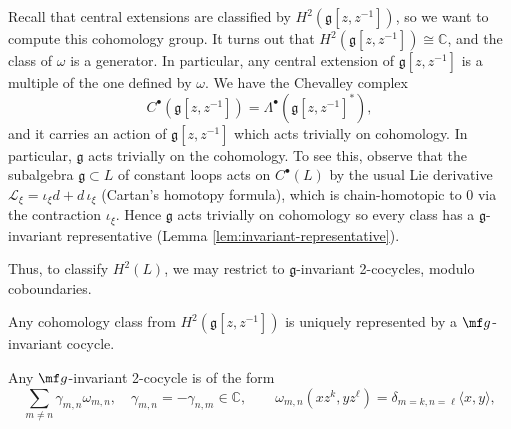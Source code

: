 \documentclass[12pt]{article}
\begin{document}
Recall that central extensions are classified by $H^2(\mathfrak{g}[z,z^{-1}])$, so we want to compute this cohomology group. It turns out that $H^2(\mathfrak{g}[z,z^{-1}]) \cong \mathbb{C}$, and the class of $\omega$ is a generator. In particular, any central extension of $\mathfrak{g}[z,z^{-1}]$ is a multiple of the one defined by $\omega$. We have the Chevalley complex
\[
    C^\bullet(\mathfrak{g}[z,z^{-1}]) = \Lambda^\bullet(\mathfrak{g}[z,z^{-1}]^*),
\]
and it carries an action of $\mathfrak{g}[z,z^{-1}]$ which acts trivially on cohomology. In particular, $\mathfrak{g}$ acts trivially on the cohomology.
To see this, observe that the subalgebra $\mathfrak g\subset L$ of constant loops acts on $C^\bullet(L)$ by the usual Lie derivative
$\mathcal L_\xi = \iota_\xi d + d\,\iota_\xi$ (Cartan's homotopy formula), which is chain-homotopic to 0 via the contraction $\iota_\xi$.
Hence $\mathfrak g$ acts trivially on cohomology so every class has a $\mathfrak g$-invariant representative (Lemma \ref{lem:invariant-representative}).

Thus, to classify $H^2(L)$, we may restrict to $\mathfrak g$-invariant 2-cocycles, modulo coboundaries.

\begin{proposition}
    Any cohomology class from $H^2(\mathfrak{g}[z,z^{-1}])$ is uniquely represented by a $\mf g$-invariant cocycle.

    Any $\mf g$-invariant 2-cocycle is of the form
    \[
        \sum_{m\neq n} \gamma_{m,n} \omega_{m,n}, \quad
        \gamma_{m,n} = -\gamma_{n,m} \in \mathbb{C}, \qquad
        \omega_{m,n}(xz^k, yz^\ell) = \delta_{m=k,n=\ell} \langle x,y\rangle,
    \]
\end{proposition}
\end{document}
